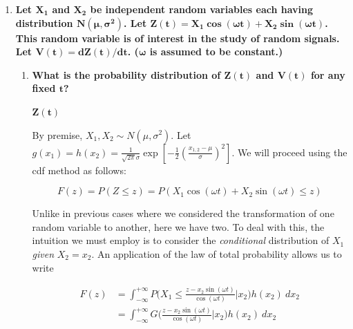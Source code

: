 \documentclass[10pt, oneside]{article}
\begin{document}
\begin{enumerate}[label=9.\arabic*]
By premise, $X \sim N(100,16)$. We calculate

\begin{align*}
E[\text{Profit}] &= 25 P(X > 95) + 10 P(X \leq 95) \\
&= 25 \bigg(1 - \Phi \bigg( \frac{95-100}{4} \bigg) \bigg) + 10 \Phi \bigg( \frac{95-100}{4} \bigg) \\
&= 25 (1 - \Phi(-5/4)) + 10 \Phi(-5/4) \\
&\approx \boxed{\$ 23.42}
\end{align*}

\item  \begin{tcolorbox}[
  colback=Cerulean!5!white,
  colframe=Cerulean!75!black]
\textbf{Let $\bm{X_1}$ and $\bm{X_2}$ be independent random variables each having distribution $\bm{N(\mu, \sigma^2)}$. Let $\bm{Z(t) = X_1 \cos (\omega t) + X_2 \sin (\omega t)}$. This random variable is of interest in the study of random signals. Let $\bm{V(t) = dZ(t)/dt}$. ($\bm{\omega}$ is assumed to be constant.)}
\end{tcolorbox}

	\begin{enumerate}
	\item  \begin{tcolorbox}[
	  colback=Cerulean!5!white,
	  colframe=Cerulean!75!black]
	\textbf{What is the probability distribution of $\bm{Z(t)}$ and $\bm{V(t)}$ for any fixed $\bm{t}$?}
	\end{tcolorbox}
	
	$\bm{Z(t)}$
	
	By premise, $X_1, X_2 \sim N(\mu, \sigma^2)$. Let $g(x_1) = h(x_2) = \frac{1}{\sqrt{2 \pi} \sigma} \exp[-\frac{1}{2} (\frac{x_{1,2} - \mu}{\sigma})^2]$. We will proceed using the cdf method as follows:
	
	\[ F(z) = P(Z \leq z) = P(X_1 \cos(\omega t) + X_2 \sin(\omega t) \leq z) \]
	
	Unlike in previous cases where we considered the transformation of one random variable to another, here we have two. To deal with this, the intuition we must employ is to consider the \textit{conditional} distribution of $X_1$ \textit{given} $X_2 = x_2$. An application of the law of total probability allows us to write
	
	\begin{align*}
	F(z) &= \int^{+\infty}_{-\infty} P \bigg( X_1 \leq \frac{z - x_2 \sin (\omega t) }{\cos (\omega t)} \bigg| x_2 \bigg) h(x_2) \ dx_2 \\
	&= \int^{+\infty}_{-\infty} G \bigg( \frac{z - x_2 \sin (\omega t) }{\cos (\omega t)} \bigg| x_2 \bigg) h(x_2) \ dx_2
	\end{align*}
	

\end{enumerate}
\end{enumerate}
\end{document}
